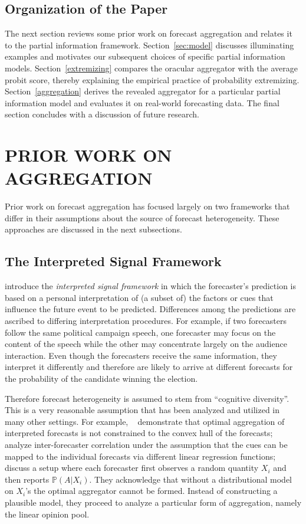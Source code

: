 \documentclass[12pt]{article}
\renewcommand{\P}{\mathbb{P}}
\theoremstyle{definition}
\theoremstyle{definition}
\def\P{{\mathbb P}}
\begin{document}
\subsection{Organization of the Paper}

The next section reviews some prior work on forecast aggregation and relates it to the partial information framework.
Section~\ref{sec:model} discusses illuminating examples and
motivates our subsequent choices of specific partial information
models.  Section~\ref{extremizing} compares the oracular aggregator with the average probit score, thereby explaining the
empirical practice of probability extremizing.
Section~\ref{aggregation} derives the revealed aggregator for a
particular partial information model and evaluates it on real-world
forecasting data.  The final section concludes with a discussion of
future research.


\section{PRIOR WORK ON AGGREGATION}
\label{sec:prior}
Prior work on forecast aggregation has focused largely on two frameworks that differ in their assumptions about the source of forecast heterogeneity.  These approaches are discussed in the next subsections.

\subsection{The Interpreted Signal Framework}
\label{ss:inerpreted}

\citet{hong2009interpreted} introduce the {\em interpreted signal
framework} in which the forecaster's prediction is based on a personal
interpretation of (a subset of) the factors or cues that influence the
future event to be predicted.  Differences among the 
predictions are ascribed to differing interpretation procedures.  For
example, if two forecasters follow the same political campaign speech,
one forecaster may focus on the content of the speech while the other may
concentrate largely on the audience interaction.  Even though the
forecasters receive the same information, they interpret it
differently and therefore are likely to arrive at different forecasts for the probability of the candidate winning the election.

Therefore forecast heterogeneity is assumed to stem from ``cognitive
diversity''.  This is a very reasonable assumption that has been analyzed and
utilized in many other settings.  For example,
~\citet{parunak2013characterizing} demonstrate that optimal
aggregation of interpreted forecasts is not constrained to the
convex hull of the forecasts; \citet{broomell2009experts} analyze
inter-forecaster correlation under the assumption that the cues can be
mapped to the individual forecasts via different linear regression
functions; \citet{degroot1991optimal} discuss a setup where each forecaster first observes a random quantity $X_i$ and then reports $\P(A | X_i)$. They  acknowledge that without a distributional model on $X_i$'s the optimal aggregator cannot be formed. Instead of constructing a plausible model, they proceed to analyze a particular form of aggregation, namely the linear opinion pool. 
\end{document}
